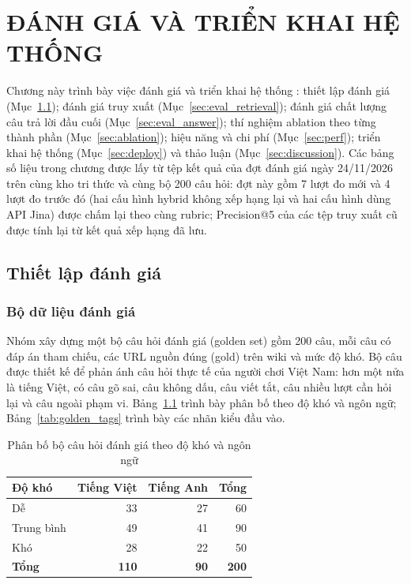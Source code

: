 \chapter{ĐÁNH GIÁ VÀ TRIỂN KHAI HỆ THỐNG}
\label{chap:eval}

Chương này trình bày việc đánh giá và triển khai hệ thống \IB{}: thiết lập đánh giá (Mục~\ref{sec:eval_setup}); đánh giá truy xuất (Mục~\ref{sec:eval_retrieval}); đánh giá chất lượng câu trả lời đầu cuối (Mục~\ref{sec:eval_answer}); thí nghiệm ablation theo từng thành phần (Mục~\ref{sec:ablation}); hiệu năng và chi phí (Mục~\ref{sec:perf}); triển khai hệ thống (Mục~\ref{sec:deploy}) và thảo luận (Mục~\ref{sec:discussion}). Các bảng số liệu trong chương được lấy từ tệp kết quả của đợt đánh giá ngày 24/11/2026 trên cùng kho tri thức và cùng bộ 200 câu hỏi: đợt này gồm 7 lượt đo mới và 4 lượt đo trước đó (hai cấu hình hybrid không xếp hạng lại và hai cấu hình dùng API Jina) được chấm lại theo cùng rubric; Precision@5 của các tệp truy xuất cũ được tính lại từ kết quả xếp hạng đã lưu.

\section{Thiết lập đánh giá}
\label{sec:eval_setup}

\subsection{Bộ dữ liệu đánh giá}
\label{sec:golden_set}

Nhóm xây dựng một bộ câu hỏi đánh giá (golden set) gồm 200 câu, mỗi câu có đáp án tham chiếu, các URL nguồn đúng (gold) trên wiki và mức độ khó. Bộ câu được thiết kế để phản ánh câu hỏi thực tế của người chơi Việt Nam: hơn một nửa là tiếng Việt, có câu gõ sai, câu không dấu, câu viết tắt, câu nhiều lượt cần hỏi lại và câu ngoài phạm vi. Bảng~\ref{tab:golden_dist} trình bày phân bố theo độ khó và ngôn ngữ; Bảng~\ref{tab:golden_tags} trình bày các nhãn kiểu đầu vào.

\begin{table}[H]
    \centering
    \caption{Phân bố bộ câu hỏi đánh giá theo độ khó và ngôn ngữ}
    \label{tab:golden_dist}
    \small
    \begin{tabular}{|l|r|r|r|}
        \toprule
        \textbf{Độ khó} & \textbf{Tiếng Việt} & \textbf{Tiếng Anh} & \textbf{Tổng} \\
        \midrule
        Dễ & 33 & 27 & 60 \\ \hline
        Trung bình & 49 & 41 & 90 \\ \hline
        Khó & 28 & 22 & 50 \\ \hline
        \textbf{Tổng} & \textbf{110} & \textbf{90} & \textbf{200} \\
        \bottomrule
    \end{tabular}
\end{table}

